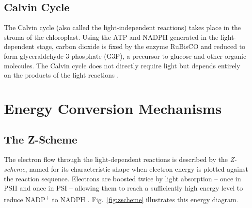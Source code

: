 \documentclass[conference]{IEEEtran}
\begin{document}
\subsection{Calvin Cycle}
The Calvin cycle (also called the light-independent reactions) takes place in the stroma of the chloroplast. Using the ATP and NADPH generated in the light-dependent stage, carbon dioxide is fixed by the enzyme RuBisCO and reduced to form glyceraldehyde-3-phosphate (G3P), a precursor to glucose and other organic molecules. The Calvin cycle does not directly require light but depends entirely on the products of the light reactions \cite{libretexts_openStax}.

\section{Energy Conversion Mechanisms}

\subsection{The Z-Scheme}
The electron flow through the light-dependent reactions is described by the \textit{Z-scheme}, named for its characteristic shape when electron energy is plotted against the reaction sequence. Electrons are boosted twice by light absorption -- once in PSII and once in PSI -- allowing them to reach a sufficiently high energy level to reduce NADP\textsuperscript{+} to NADPH \cite{bioninja}. Fig.~\ref{fig:zscheme} illustrates this energy diagram.
\end{document}
